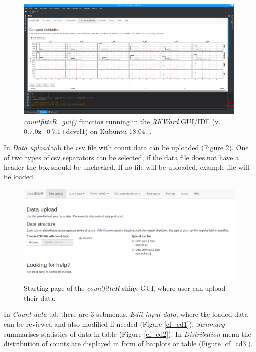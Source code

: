 \begin{figure}[htbp]
  \centering
  \includegraphics[width=0.99\columnwidth]{fig_gui}
  \caption{\emph{countfitteR\_gui()} function running in the \emph{RKWard} GUI/IDE (v. 0.7.0z+0.7.1+devel1) on Kubuntu 18.04. \citep{rodiger_rkward:_2012}.}
  \label{fig_gui}
\end{figure}
In \textit{Data upload} tab the csv file with count data can be uploaded (Figure \ref{cf_main}). One of two types of csv separators can be selected, if the data file does not have a header the box should be unchecked. If no file will be uploaded, example file will be loaded.

\begin{figure}[htbp]
  \centering
  \includegraphics[width=0.99\columnwidth]{fig/cf_main.png}
  \caption{Starting page of the \emph{countfitteR} shiny GUI, where user can upload their data.}
    \label{cf_main}
\end{figure}

In \textit{Count data} tab there are 3 submenus. \textit{Edit input data}, where the loaded data can be reviewed and also modified if needed (Figure \ref{cf_cd1}). \textit{Summary} summarises statistics of data in table (Figure \ref{cf_cd2}). In \textit{Distribution} menu the distribution of counts are displayed in form of barplots or table (Figure \ref{cf_cd3}).

